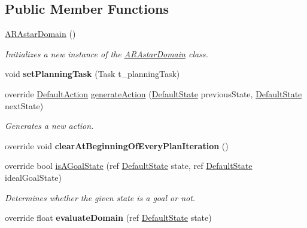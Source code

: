 \subsection*{Public Member Functions}
\begin{DoxyCompactItemize}
\item 
\hyperlink{class_a_r_astar_domain_a6bf71019a03f9d4f0fdfb7bca1b26f60}{A\-R\-Astar\-Domain} ()
\begin{DoxyCompactList}\small\item\em Initializes a new instance of the \hyperlink{class_a_r_astar_domain}{A\-R\-Astar\-Domain} class. \end{DoxyCompactList}\item 
\hypertarget{class_a_r_astar_domain_a4dc68e076d4738c797c22a52f7853fc3}{void {\bfseries set\-Planning\-Task} (Task t\-\_\-planning\-Task)}\label{class_a_r_astar_domain_a4dc68e076d4738c797c22a52f7853fc3}

\item 
override \hyperlink{class_default_action}{Default\-Action} \hyperlink{class_a_r_astar_domain_ab246607e9d2bcc02d129dc0414a4de33}{generate\-Action} (\hyperlink{class_default_state}{Default\-State} previous\-State, \hyperlink{class_default_state}{Default\-State} next\-State)
\begin{DoxyCompactList}\small\item\em Generates a new action. \end{DoxyCompactList}\item 
\hypertarget{class_a_r_astar_domain_a84137b03c38d5085c79ce15d42b8fa21}{override void {\bfseries clear\-At\-Beginning\-Of\-Every\-Plan\-Iteration} ()}\label{class_a_r_astar_domain_a84137b03c38d5085c79ce15d42b8fa21}

\item 
override bool \hyperlink{class_a_r_astar_domain_a98710baa163975101bee4a3b5c8ba439}{is\-A\-Goal\-State} (ref \hyperlink{class_default_state}{Default\-State} state, ref \hyperlink{class_default_state}{Default\-State} ideal\-Goal\-State)
\begin{DoxyCompactList}\small\item\em Determines whether the given state is a goal or not. \end{DoxyCompactList}\item 
\hypertarget{class_a_r_astar_domain_ae4a5180a514904b4e689da12746f1412}{override float {\bfseries evaluate\-Domain} (ref \hyperlink{class_default_state}{Default\-State} state)}\label{class_a_r_astar_domain_ae4a5180a514904b4e689da12746f1412}


\end{DoxyCompactItemize}
